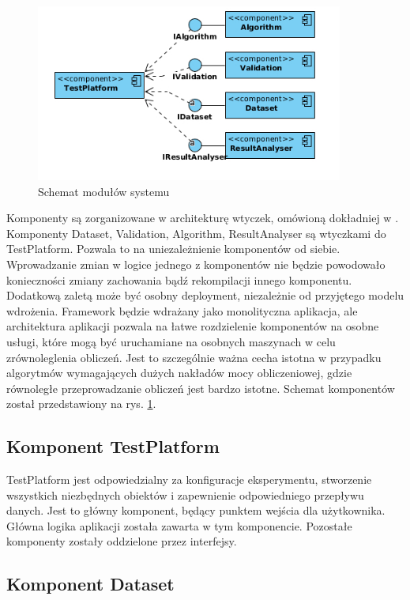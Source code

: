 \documentclass[12pt]{article}
\begin{document}
\begin{figure}
\centering
	\includegraphics[width=0.9\textwidth]{img/ModulesDiagram.jpg}
	\caption{Schemat modułów systemu}
	\label{fig:modules_diagram}
\end{figure}

Komponenty są zorganizowane w architekturę wtyczek, omówioną dokładniej w \cite{clean-arch}. Komponenty Dataset, Validation, Algorithm, ResultAnalyser są wtyczkami do TestPlatform. Pozwala to na uniezależnienie komponentów od siebie. Wprowadzanie zmian w logice jednego z komponentów nie będzie powodowało konieczności zmiany zachowania bądź rekompilacji innego komponentu. Dodatkową zaletą może być osobny deployment, niezależnie od przyjętego modelu wdrożenia. Framework będzie wdrażany jako monolityczna aplikacja, ale architektura aplikacji pozwala na łatwe rozdzielenie komponentów na osobne usługi, które mogą być uruchamiane na osobnych maszynach w celu zrównoleglenia obliczeń. Jest to szczególnie ważna cecha istotna w przypadku algorytmów wymagających dużych nakładów mocy obliczeniowej, gdzie równoległe przeprowadzanie obliczeń jest bardzo istotne. Schemat komponentów został przedstawiony na rys. \ref{fig:modules_diagram}.

\subsection{Komponent TestPlatform}

TestPlatform jest odpowiedzialny za konfiguracje eksperymentu, stworzenie wszystkich niezbędnych obiektów i zapewnienie odpowiedniego przepływu danych. Jest to główny komponent, będący punktem wejścia dla użytkownika. Główna logika aplikacji została zawarta w tym komponencie. Pozostałe komponenty zostały oddzielone przez interfejsy. 

\subsection{Komponent Dataset}
\end{document}
